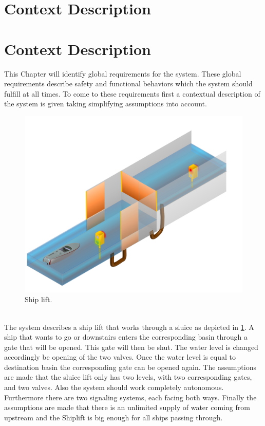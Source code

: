 
\section{Context Description}
\section{Context Description}
This Chapter will identify global requirements for the system. These global requirements describe safety and functional behaviors which the system should fulfill at all times. To come to these requirements first a contextual description of the system is given taking simplifying assumptions into account.
\begin{figure}[!h]
	\includegraphics[width=\linewidth]{New}
	\caption{Ship lift.}
	\label{fig:boat1}
\end{figure}

\noindent
\\The system describes a ship lift that works through a sluice as depicted in \ref{fig:boat1}. A ship that wants to go or downstairs enters the corresponding basin through a gate that will be opened. This gate will then be shut. The water level is changed accordingly be opening of the two valves. Once the water level is equal to destination basin the corresponding gate can be opened again. The assumptions are made that the sluice lift only has two levels, with two corresponding gates, and two valves. Also the system should work completely autonomous. Furthermore there are two signaling systems, each facing both ways. Finally the assumptions are made that there is an unlimited supply of water coming from upstream and the Shiplift is big enough for all ships passing through. \\
